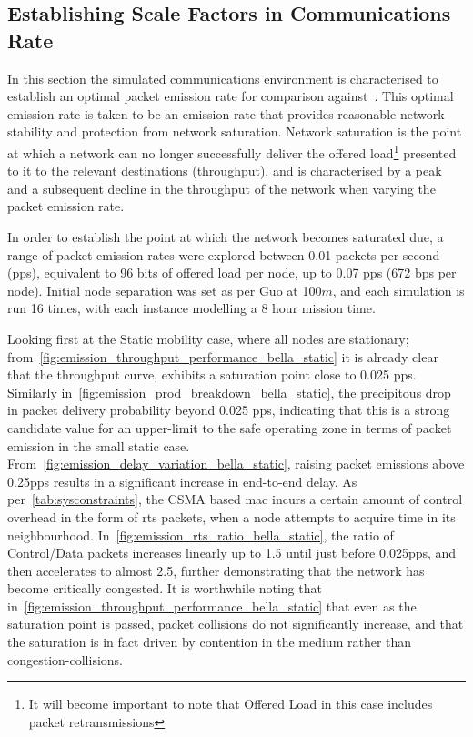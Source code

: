 \subsection{Establishing Scale Factors in Communications Rate}

In this section the simulated communications environment is characterised to establish an optimal packet emission rate for comparison against~\cite{Guo11}.
This optimal emission rate is taken to be an emission rate that provides reasonable network stability and protection from network saturation.
Network saturation is the point at which a network can no longer successfully deliver the offered load\footnote{It will become important to note that Offered Load in this case includes packet retransmissions} presented to it to the relevant destinations (throughput), and is characterised by a peak and a subsequent decline in the throughput of the network when varying the packet emission rate. 

In order to establish the point at which the network becomes saturated due, a range of packet emission rates were explored between 0.01 packets per second (pps), equivalent to 96 bits of offered load per node, up to 0.07 pps (672 bps per node).
Initial node separation was set as per Guo at 100$m$, and each simulation is run 16 times, with each instance modelling a 8 hour mission time.

Looking first at the Static mobility case, where all nodes are stationary; from~\autoref{fig:emission_throughput_performance_bella_static} it is already clear that the throughput curve, exhibits a saturation point close to 0.025 pps.
Similarly in~\autoref{fig:emission_prod_breakdown_bella_static}, the precipitous drop in packet delivery probability beyond 0.025 pps, indicating that this is a strong candidate value for an upper-limit to the safe operating zone in terms of packet emission in the small static case.
From~\autoref{fig:emission_delay_variation_bella_static}, raising packet emissions above 0.25pps results in a significant increase in end-to-end delay.
As per~\autoref{tab:sysconstraints}, the CSMA based \gls{mac} incurs a certain amount of control overhead in the form of \gls{rts} packets, when a node attempts to acquire time in its neighbourhood.
In~\autoref{fig:emission_rts_ratio_bella_static}, the ratio of Control/Data packets increases linearly up to 1.5 until just before 0.025pps, and then accelerates to almost 2.5, further demonstrating that the network has become critically congested.
It is worthwhile noting that in~\autoref{fig:emission_throughput_performance_bella_static} that even as the saturation point is passed, packet collisions do not significantly increase, and that the saturation is in fact driven by contention in the medium rather than congestion-collisions.

